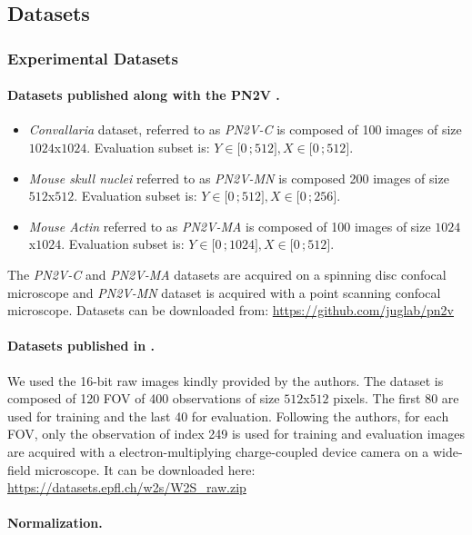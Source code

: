 \documentclass{article}
\newcommand{\interval}[2]{\mathopen{[}#1\,;#2\mathclose{]}}
\begin{document}
\subsection{Datasets}
\subsubsection{Experimental Datasets}
\label{si:datasetxp}
\paragraph{Datasets published along with the PN2V \cite{krull2019probabilistic}.}
\begin{itemize}
  \item \emph{Convallaria} dataset, referred to as \emph{PN2V-C} is composed of 100 images of size $1024$x$1024$. Evaluation subset is: $Y\in\interval{0}{512}, X\in\interval{0}{512}$.
  \item \emph{Mouse skull nuclei} referred to as \emph{PN2V-MN} is composed 200 images of size $512$x$512$. Evaluation subset is: $Y\in\interval{0}{512}, X\in\interval{0}{256}$.
  \item \emph{Mouse Actin} referred to as \emph{PN2V-MA} is composed of 100 images of size $1024$x$1024$. Evaluation subset is: $Y\in\interval{0}{1024}, X\in\interval{0}{512}$.
\end{itemize}

The \emph{PN2V-C} and \emph{PN2V-MA} datasets are acquired on a spinning disc confocal microscope and \emph{PN2V-MN} dataset is acquired with a point scanning confocal microscope.
Datasets can be downloaded from: \url{https://github.com/juglab/pn2v}

\paragraph{Datasets published in \cite{zhou2020w2s}.}

We used the 16-bit raw images kindly provided by the authors.
The dataset is composed of 120 FOV of 400 observations of size $512$x$512$ pixels.
The first 80 are used for training and the last 40 for evaluation.
Following the authors, for each FOV, only the observation of index 249 is used for training and evaluation
images are acquired with a electron-multiplying charge-coupled device camera on a wide-field microscope.
It can be downloaded here: \url{https://datasets.epfl.ch/w2s/W2S_raw.zip}

\paragraph{Normalization.}
\end{document}
